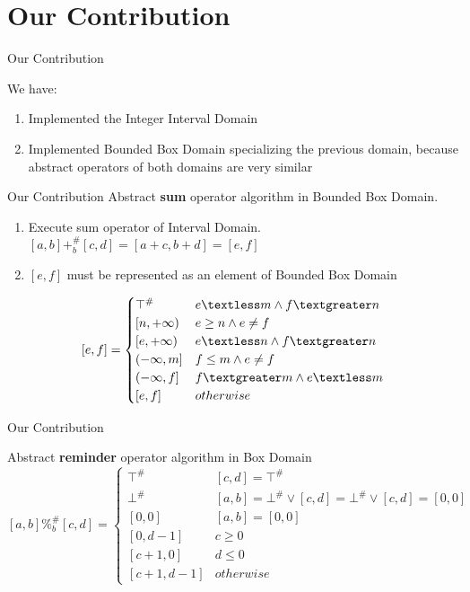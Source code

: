 \documentclass{beamer}
\begin{document}
	\section{Our Contribution}
	
	\begin{frame}{Our Contribution}

	
	We have:\\
	\begin{enumerate}
		\item Implemented the Integer Interval Domain
		\item Implemented Bounded Box Domain specializing the previous domain, because abstract operators of both domains are very similar
	\end{enumerate}
	
	\end{frame}

	\begin{frame}{Our Contribution}
		Abstract \textbf{sum} operator algorithm in Bounded Box Domain. 
		\begin{enumerate}
			\item Execute sum operator of Interval Domain. \\
			$[a,b] +_{b}^\# [c,d] = [a + c,b + d] = [e,f]$
			\item $[e,f]$ must be represented as an element of Bounded Box Domain
		\end{enumerate}
	\[ [e,f] =
	\begin{cases} 
	\top^\# & e \textless m \land f \textgreater n\\
	[n,+\infty) & e \geq n  \land  e \neq f\\
	[e,+\infty) & e \textless n \land f \textgreater n\\
	(-\infty,m] & f \leq m \land e \neq f\\
	(-\infty,f] & f \textgreater m \land e \textless m \\
	[e,f] & otherwise
	\end{cases}
	\]
		
	\end{frame}
	\begin{frame}{Our Contribution}
		\begin{block}{Abstract \textbf{reminder} operator algorithm in Box Domain}
		\scriptsize	
		\[ [a,b] \%_{b}^\# [c,d] =
		\begin{cases}
		\top^\# & [c,d] = \top^\# \\
		\bot^\# & [a,b] = \bot^\# \lor [c,d] = \bot^\# \lor [c,d] = [0,0] \\ 
		[0,0] & [a,b] = [0,0] \\
		[0,d-1] & c \geq 0\\
		[c+1,0] & d \leq 0 \\
		[c+1,d-1] & otherwise
		\end{cases}
		\]
		\normalsize
	\end{block}
	
	\end{frame}
\end{document}
